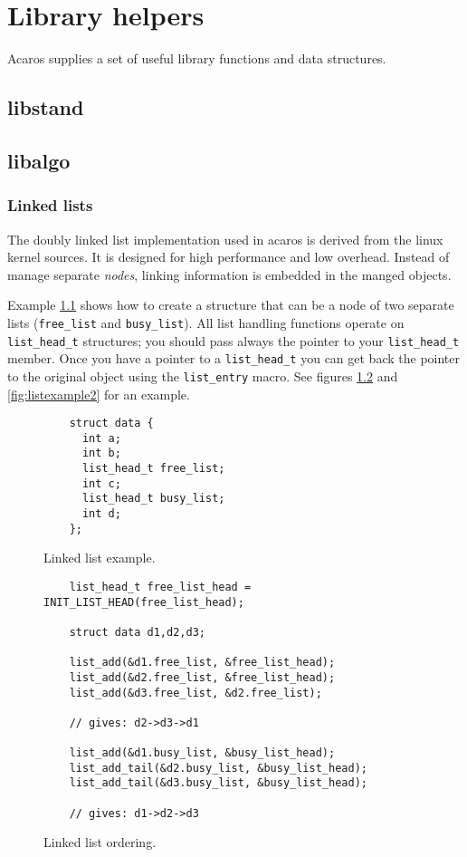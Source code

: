 \chapter{Library helpers}

Acaros supplies a set of useful library functions and data
structures.

\section{libstand}
\section{libalgo}

\subsection{Linked lists}
The doubly linked list implementation used in acaros
is derived from the linux kernel sources. It is designed
for high performance and low overhead. Instead of
manage separate \emph{nodes}, linking information is embedded
in the manged objects.

Example \ref{fig:link1} shows how to create a structure that
can be a node of two separate lists (\texttt{free\_list} and \texttt{busy\_list}).
 All list handling functions operate on \texttt{list\_head\_t} structures;
you should pass always the pointer to your \texttt{list\_head\_t} member.
 Once you have a pointer to a \texttt{list\_head\_t} you can get back 
the pointer to the original object using the \texttt{list\_entry} macro.
 See figures \ref{fig:listexample1} and \ref{fig:listexample2} for an example.

\begin{figure}[h!]
  \begin{verbatim}
    struct data {
      int a;
      int b;
      list_head_t free_list;
      int c;
      list_head_t busy_list;
      int d;
    };
  \end{verbatim}
  \caption{Linked list example.}
  \label{fig:link1}
\end{figure}

\begin{figure}[h!]
  \begin{verbatim}
    list_head_t free_list_head = INIT_LIST_HEAD(free_list_head);
    
    struct data d1,d2,d3;
    
    list_add(&d1.free_list, &free_list_head);
    list_add(&d2.free_list, &free_list_head);
    list_add(&d3.free_list, &d2.free_list);

    // gives: d2->d3->d1

    list_add(&d1.busy_list, &busy_list_head);
    list_add_tail(&d2.busy_list, &busy_list_head);
    list_add_tail(&d3.busy_list, &busy_list_head);

    // gives: d1->d2->d3
  \end{verbatim}
  \caption{Linked list ordering.}
  \label{fig:listexample1}
\end{figure}

